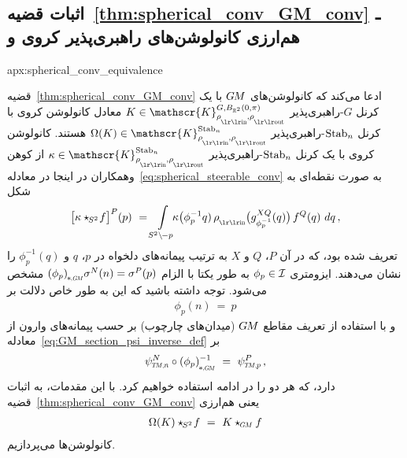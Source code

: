 \toclesslab\subsection{اثبات قضیه~\ref{thm:spherical_conv_GM_conv} ـ هم‌ارزی کانولوشن‌های راهبری‌پذیر کروی و \textit{}}{apx:spherical_conv_equivalence}


قضیه~\ref{thm:spherical_conv_GM_conv} ادعا می‌کند که کانولوشن‌های $G\mkern-1.4muM$ با یک کرنل $G$-راهبری‌پذیر $K \in \mathscr{K}^{G,B_{\R^2}(0,\pi)}_{\rhoin\mkern-1mu,\rhoout}$ معادل کانولوشن کروی با کرنل $\operatorname{Stab}_{n}$-راهبری‌پذیر $\Omega(K) \in \mathscr{K}^{\Stab{n}}_{\rhoin\mkern-1mu,\rhoout}$ هستند.
کانولوشن کروی با یک کرنل $\operatorname{Stab}_{n}$-راهبری‌پذیر $\kappa \in \mathscr{K}^{\Stab{n}}_{\rhoin\mkern-1mu,\rhoout}$ از کوهن وهمکاران \cite{Cohen2018-intertwiners,Cohen2019-generaltheory} در اینجا در معادله~\eqref{eq:spherical_steerable_conv} به صورت نقطه‌ای به شکل
\begin{align}
    \big[\kappa \star_{\mkern-2mu S^2}\! f\big]^P(p)
    \ = \int\limits_{S^2 \backslash \mkern-2mu -p} \mkern-8mu \kappa\big(\phi_p^{-1}q)\, \rhoin\big( g_{\phi_p^{-1}}^{XQ}(q) \big)\, f^Q(q)\ dq \,,
\end{align}
تعریف شده بود، که در آن $P$، $Q$ و $X$ به ترتیب پیمانه‌های دلخواه در $p$، $q$ و $\phi_p^{-1}(q)$ را نشان می‌دهند.
ایزومتری $\phi_p \in \mathcal{I}$ به طور یکتا با الزام $\dphipGM \sigma^N(n) = \sigma^P(p)$ مشخص می‌شود.
توجه داشته باشید که این به طور خاص دلالت بر
\begin{align}\label{eq:phipn_sphere_action}
    \phi_p(n) \ =\ p
\end{align}
و با استفاده از تعریف مقاطع $G\mkern-1.4muM$ (میدان‌های چارچوب) بر حسب پیمانه‌های وارون از معادله~\eqref{eq:GM_section_psi_inverse_def} بر
\begin{align}\label{eq:phipn_gauges}
    \psiTMn^N \circ \dphipGM^{-1} \ =\ \psiTMp^P \,,
\end{align}
دارد، که هر دو را در ادامه استفاده خواهیم کرد.
با این مقدمات، به اثبات قضیه~\ref{thm:spherical_conv_GM_conv} یعنی هم‌ارزی
\begin{align}
    \Omega(K) \star_{\mkern-2mu S^2}\! f\ =\ K \star_{\mkern-1mu\scalebox{.64}{$\GM$}} f
\end{align}
کانولوشن‌ها می‌پردازیم.

